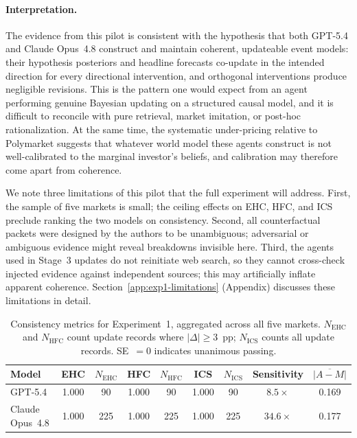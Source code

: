 \paragraph{Interpretation.}
The evidence from this pilot is consistent with the hypothesis that both GPT-5.4 and Claude
Opus~4.8 construct and maintain coherent, updateable event models: their hypothesis posteriors
and headline forecasts co-update in the intended direction for every directional intervention,
and orthogonal interventions produce negligible revisions.  This is the pattern one would
expect from an agent performing genuine Bayesian updating on a structured causal model, and it
is difficult to reconcile with pure retrieval, market imitation, or post-hoc rationalization.
At the same time, the systematic under-pricing relative to Polymarket suggests that whatever
world model these agents construct is not well-calibrated to the marginal investor's beliefs,
and calibration may therefore come apart from coherence.

We note three limitations of this pilot that the full experiment will address.
First, the sample of five markets is small; the ceiling effects on EHC, HFC, and ICS preclude
ranking the two models on consistency.  Second, all counterfactual packets were designed by the
authors to be unambiguous; adversarial or ambiguous evidence might reveal breakdowns invisible
here.  Third, the agents used in Stage~3 updates do not reinitiate web search, so they cannot
cross-check injected evidence against independent sources; this may artificially inflate apparent
coherence.  Section~\ref{app:exp1-limitations} (Appendix) discusses these limitations in detail.

\begin{table}[t]
\centering
\caption{Consistency metrics for Experiment~1, aggregated across all five markets.
$N_\text{EHC}$ and $N_\text{HFC}$ count update records where $|\Delta| \geq 3$~pp;
$N_\text{ICS}$ counts all update records.  SE~$=0$ indicates unanimous passing.}
\label{tab:consistency}
\begin{tabular}{lcccccccc}
\toprule
\textbf{Model} & \textbf{EHC} & $N_\text{EHC}$ & \textbf{HFC} & $N_\text{HFC}$
               & \textbf{ICS} & $N_\text{ICS}$ & \textbf{Sensitivity} & $\overline{|A{-}M|}$ \\
\midrule
GPT-5.4          & 1.000 & 90 & 1.000 & 90 & 1.000 & 90 & $8.5\times$  & 0.169 \\
Claude Opus~4.8  & 1.000 & 225 & 1.000 & 225 & 1.000 & 225 & $34.6\times$ & 0.177 \\
\bottomrule
\end{tabular}
\end{table}


